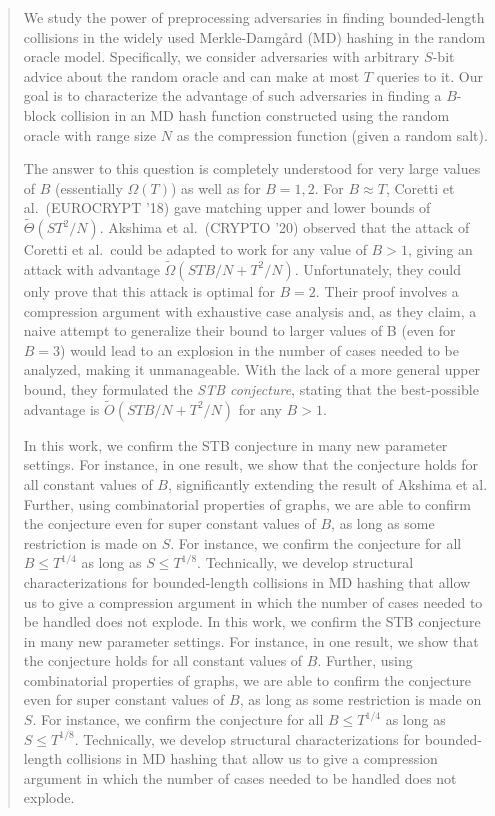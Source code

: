 
\begin{abstract}
  We study the power of preprocessing adversaries in finding bounded-length collisions in the widely used Merkle-Damg{\aa}rd (MD) hashing in the random oracle model. Specifically, we consider adversaries with arbitrary $S$-bit advice about the random oracle and can make at most $T$ queries to it. Our goal is to characterize the advantage of such adversaries in finding a $B$-block collision in an MD hash function constructed using the random oracle with range size $N$ as the compression function (given a random salt).
  
  The answer to this question is completely understood for very large values of $B$ (essentially $\Omega(T)$) as well as for $B=1,2$. For $B\approx T$, Coretti et al.~(EUROCRYPT '18) gave matching upper and lower bounds of $\tilde\Theta(ST^2/N)$. Akshima et al.~(CRYPTO '20) observed that the attack of Coretti et al.\ could be adapted to work for any value of $B>1$, giving an attack with advantage $\tilde\Omega(STB/N + T^2/N)$. Unfortunately, they could only prove that this attack is optimal for $B=2$. Their proof involves a compression argument with exhaustive case analysis and, as they claim, a naive attempt to generalize their bound to larger values of B (even for $B=3$) would lead to an explosion in the number of cases needed to be analyzed, making it unmanageable.  With the lack of a more general upper bound, they formulated the \emph{STB conjecture}, stating that the best-possible advantage is $\tilde O(STB/N + T^2/N)$ for any $B>1$. 

  \ifnum{}
  In this work, we confirm the STB conjecture in many new parameter settings. For instance, in one result, we show that the conjecture holds for all constant values of $B$, significantly extending the result of Akshima et al. Further, using combinatorial properties of graphs, we are able to confirm the conjecture even for super constant values of $B$, as long as some restriction is made on $S$. For instance, we confirm the conjecture for all $B \le T^{1/4}$ as long as $S \le T^{1/8}$. Technically,  
  we develop structural characterizations for bounded-length collisions in MD hashing that allow us to give a compression argument in which the number of cases needed to be handled does not explode. 
  \else
  In this work, we confirm the STB conjecture in many new parameter settings. For instance, in one result, we show that the conjecture holds for all constant values of $B$. Further, using combinatorial properties of graphs, we are able to confirm the conjecture even for super constant values of $B$, as long as some restriction is made on $S$. For instance, we confirm the conjecture for all $B \le T^{1/4}$ as long as $S \le T^{1/8}$. Technically,  
  we develop structural characterizations for bounded-length collisions in MD hashing that allow us to give a compression argument in which the number of cases needed to be handled does not explode. 
  \fi
  
 

\end{abstract}
